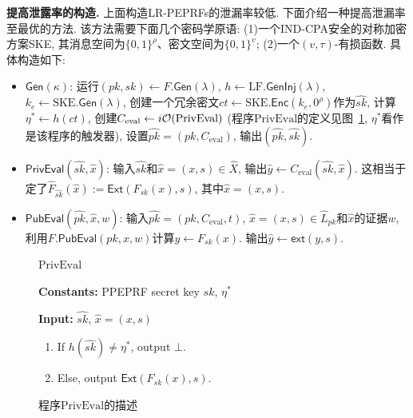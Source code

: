 \medskip\noindent\textbf{提高泄露率的构造.} 上面构造LR-PEPRFs的泄漏率较低. 下面介绍一种提高泄漏率至最优的方法. 该方法需要下面几个密码学原语: (1)一个IND-CPA安全的对称加密方案SKE, 其消息空间为$\{0,1\}^{\rho}$、密文空间为$\{0,1\}^v$; (2)一个$(v, \tau)$-有损函数. 具体构造如下:

\begin{itemize}\itemsep 1pt \parskip 0pt \parsep 0pt
\item $\mathsf{Gen}(\kappa)$: 运行$(pk, sk) \leftarrow F.\mathsf{Gen}(\lambda)$,  
    $h \leftarrow \text{LF}.\mathsf{GenInj}(\lambda)$, $k_e \leftarrow \text{SKE}.\mathsf{Gen}(\lambda)$, 创建一个冗余密文$ct \leftarrow \text{SKE}.\mathsf{Enc}(k_e, 0^\rho)$作为$\hat{sk}$, 计算$\eta^* \leftarrow h(ct)$, 创建$C_\text{eval} \leftarrow i\mathcal{O}(\text{PrivEval})$ (程序$\text{PrivEval}$的定义见图~\ref{fig:ch5-improved-PPEPRF-PrivEval}, $\eta^*$看作是该程序的触发器), 设置$\hat{pk} = (pk, C_\text{eval})$, 输出$(\hat{pk}, \hat{sk})$.  

\item $\mathsf{PrivEval}(\hat{sk}, \hat{x})$: 输入$\hat{sk}$和$\hat{x} = (x, s) \in \hat{X}$, 输出$\hat{y} \leftarrow C_\text{eval}(\hat{sk}, \hat{x})$. 这相当于定了$\hat{F}_{\hat{sk}}(\hat{x}) := \mathsf{Ext}(F_{sk}(x), s)$, 其中$\hat{x} = (x, s)$.     

\item $\mathsf{PubEval}(\hat{pk}, \hat{x}, w)$: 输入$\hat{pk} = (pk, C_\text{eval}, t)$, 
    $\hat{x} = (x, s) \in \hat{L}_{pk}$和$\hat{x}$的证据$w$, 利用$F.\mathsf{PubEval}(pk, x, w)$计算$y \leftarrow F_{sk}(x)$. 输出$\hat{y} \leftarrow \mathsf{ext}(y, s)$. 
\end{itemize}

\begin{figure}[!hbth]
\begin{framed}
\begin{minipage}[center]{\textwidth}
\begin{center}
    $\text{PrivEval}$ 
\end{center}
\vspace{-1em}
\begin{trivlist}
    \item \textbf{Constants:} PPEPRF secret key $sk$, $\eta^*$
    
    \item \textbf{Input:} $\hat{sk}$, $\hat{x} = (x, s)$ 
        \begin{enumerate}\itemsep 1pt \parskip 0pt \parsep 0pt
            \item If $h(\hat{sk}) \neq \eta^*$, output $\bot$. 
            \item Else, output $\mathsf{Ext}(F_{sk}(x), s)$. 
        \end{enumerate}
\end{trivlist}
\end{minipage}
\end{framed}
\caption{程序$\text{PrivEval}$的描述}
\label{fig:ch5-improved-PPEPRF-PrivEval}
\end{figure} 

